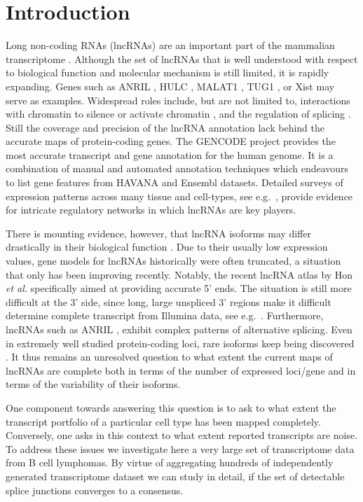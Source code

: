 \documentclass[ncrna,article,submit,moreauthors,pdftex,10pt,a4paper]{mdpi}
\begin{document}
\section{Introduction}

Long non-coding RNAs (lncRNAs) are an important part of the mammalian
transcriptome \cite{Clark:11a,ENCODE:12}. Although the set of lncRNAs that
is well understood with respect to biological function and molecular
mechanism is still limited, it is rapidly expanding. Genes such as ANRIL
\cite{Li:16A,Aguilo:16}, HULC \cite{Yu:17}, MALAT1 \cite{Liu:17}, TUG1
\cite{Li:16}, or Xist \cite{daRocha:17} may serve as examples. Widespread
roles include, but are not limited to, interactions with chromatin to
silence or activate chromatin \cite{guttmannat2012,Deng:16}, and the
regulation of splicing \cite{Luco:16}. Still the coverage and precision of
the lncRNA annotation lack behind the accurate maps of protein-coding
genes.  The GENCODE project \cite{harrow2012} provides the most accurate
transcript and gene annotation for the human genome. It is a combination of
manual and automated annotation techniques which endeavours to list gene
features from HAVANA and Ensembl datasets. Detailed surveys of expression
patterns across many tissue and cell-types, see e.g.\
\cite{cabili2011,MasPonte:17,Hon:17}, provide evidence for intricate
regulatory networks in which lncRNAs are key players.

There is mounting evidence, however, that lncRNA isoforms may differ
drastically in their biological function \cite{Holdt:13a,Bozgeyik:16}. Due
to their usually low expression values, gene models for lncRNAs
historically were often truncated, a situation that only has been improving
recently.  Notably, the recent lncRNA atlas by Hon \emph{et al.}
\cite{Hon:17} specifically aimed at providing accurate 5' ends. The
situation is still more difficult at the 3' side, since long, large
unspliced 3' regions make it difficult determine complete transcript from
Illumina data, see e.g.\ \cite{Mercer:10,Engelhardt:15a}. Furthermore,
lncRNAs such as ANRIL \cite{Holdt:13a}, exhibit complex patterns of
alternative splicing. Even in extremely well studied protein-coding loci,
rare isoforms keep being discovered \cite{Hoffmann:14a}. It thus remains an
unresolved question to what extent the current maps of lncRNAs are complete
both in terms of the number of expressed loci/gene and in terms of the
variability of their isoforms.

One component towards answering this question is to ask to what extent the
transcript portfolio of a particular cell type has been mapped completely.
Conversely, one asks in this context to what extent reported transcripts
are noise. To address these issues we investigate here a very large set of
transcriptome data from B cell lymphomas. By virtue of aggregating hundreds
of independently generated transcriptome dataset we can study in detail, if the set of detectable splice junctions converges to a consensus.
\end{document}
